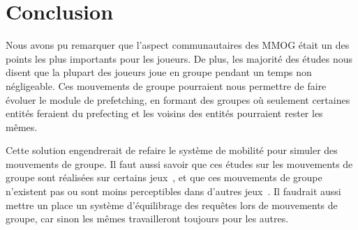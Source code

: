 \documentclass[11pt,a4paper]{article}
\begin{document}
\section{Conclusion}
Nous avons pu remarquer que l'aspect communautaires des MMOG était un des points les plus importants pour les joueurs. De plus, les majorité des études nous disent que la plupart des joueurs joue en groupe pendant un temps non négligeable. Ces mouvements de groupe pourraient nous permettre de faire évoluer le module de prefetching, en formant des groupes où seulement certaines entités feraient du prefecting et les voisins des entités pourraient rester les mêmes.
\par Cette solution engendrerait de refaire le système de mobilité pour simuler des mouvements de groupe. Il faut aussi savoir que ces études sur les mouvements de groupe sont réalisées sur certains jeux~\cite{wow,everquest}, et que ces mouvements de groupe n'existent pas ou sont moins perceptibles dans d'autres jeux~\cite{sl}. Il faudrait aussi mettre un place un système d'équilibrage des requêtes lors de mouvements de groupe, car sinon les mêmes travailleront toujours pour les autres.

\newpage




 
\end{document}
